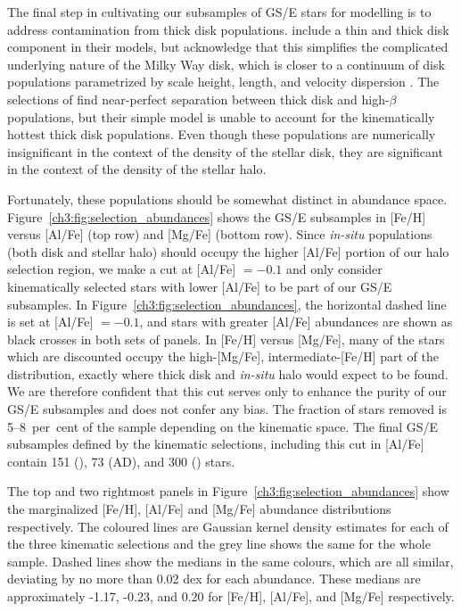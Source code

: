 The final step in cultivating our subsamples of GS/E stars for modelling is to address contamination from thick disk populations. \cite{lane22} include a thin and thick disk component in their models, but acknowledge that this simplifies the complicated underlying nature of the Milky Way disk, which is closer to a continuum of disk populations parametrized by scale height, length, and velocity dispersion \parencite{bovy12d}. The selections of \cite{lane22} find near-perfect separation between thick disk and high-$\beta$ populations, but their simple model is unable to account for the kinematically hottest thick disk populations. Even though these populations are numerically insignificant in the context of the density of the stellar disk, they are significant in the context of the density of the stellar halo.

Fortunately, these populations should be somewhat distinct in abundance space. Figure~\ref{ch3:fig:selection_abundances} shows the GS/E subsamples in [Fe/H] versus [Al/Fe] (top row) and [Mg/Fe] (bottom row). Since \textit{in-situ} populations (both disk and stellar halo) should occupy the higher [Al/Fe] portion of our halo selection region, we make a cut at [Al/Fe] $= -0.1$ and only consider kinematically selected stars with lower [Al/Fe] to be part of our GS/E subsamples. In Figure~\ref{ch3:fig:selection_abundances}, the horizontal dashed line is set at [Al/Fe] $= -0.1$, and stars with greater [Al/Fe] abundances are shown as black crosses in both sets of panels. In [Fe/H] versus [Mg/Fe], many of the stars which are discounted occupy the high-[Mg/Fe], intermediate-[Fe/H] part of the distribution, exactly where thick disk and \textit{in-situ} halo would expect to be found. We are therefore confident that this cut serves only to enhance the purity of our GS/E subsamples and does not confer any bias. The fraction of stars removed is 5--8~per~cent of the sample depending on the kinematic space. The final GS/E subsamples defined by the kinematic selections, including this cut in [Al/Fe] contain 151 (\eLz), 73 (AD), and 300 (\JRLz) stars.

The top and two rightmost panels in Figure~\ref{ch3:fig:selection_abundances} show the marginalized [Fe/H], [Al/Fe] and [Mg/Fe] abundance distributions respectively. The coloured lines are Gaussian kernel density estimates for each of the three kinematic selections and the grey line shows the same for the whole sample. Dashed lines show the medians in the same colours, which are all similar, deviating by no more than 0.02 dex for each abundance. These medians are approximately -1.17, -0.23, and 0.20 for [Fe/H], [Al/Fe], and [Mg/Fe] respectively.

